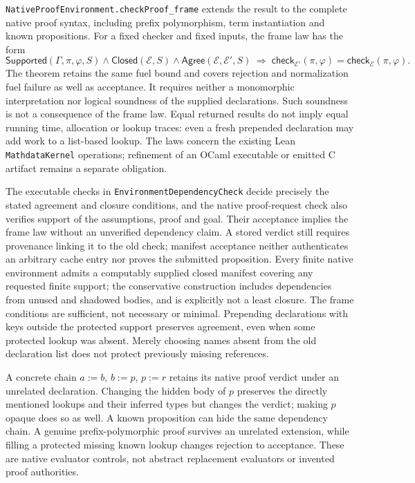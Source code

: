 \documentclass[11pt]{article}
\theoremstyle{definition}
\theoremstyle{remark}
\begin{document}
\begin{enumerate}
  \nolinkurl{NativeProofEnvironment.checkProof_frame} extends the result to
  the complete native proof syntax, including prefix polymorphism, term
  instantiation and known propositions. For a fixed checker and fixed inputs,
  the frame law has the form
  \[
    \mathsf{Supported}(\Gamma,\pi,\varphi,S)
    \land\mathsf{Closed}(\mathcal E,S)
    \land\mathsf{Agree}(\mathcal E,\mathcal E',S)
    \;\Longrightarrow\;
    \mathsf{check}_{\mathcal E'}(\pi,\varphi)
      =\mathsf{check}_{\mathcal E}(\pi,\varphi).
  \]
  The theorem retains the same fuel bound and covers rejection and normalization
  fuel failure as well as acceptance. It requires neither a monomorphic
  interpretation nor logical soundness of the supplied declarations. Such
  soundness is not a consequence of the frame law. Equal returned results do
  not imply equal running time, allocation or lookup traces: even a fresh
  prepended declaration may add work to a list-based lookup. The laws concern
  the existing Lean \nolinkurl{MathdataKernel} operations; refinement of an
  OCaml executable or emitted C artifact remains a separate obligation.

  The executable checks in \nolinkurl{EnvironmentDependencyCheck} decide
  precisely the stated agreement and closure conditions, and the native
  proof-request check also verifies support of the assumptions, proof and
  goal. Their acceptance implies the frame law without an unverified
  dependency claim. A stored verdict still requires provenance linking it to
  the old check; manifest acceptance neither authenticates an arbitrary cache
  entry nor proves the submitted proposition. Every finite native environment admits a computably
  supplied closed manifest covering any requested finite support; the
  conservative construction includes dependencies from unused and shadowed
  bodies, and is explicitly not a least closure. The frame conditions are
  sufficient, not necessary or minimal.
  Prepending declarations with keys outside the protected support preserves
  agreement, even when some protected lookup was absent. Merely choosing names
  absent from the old declaration list does not protect previously missing
  references.

  A concrete chain $a:=b$, $b:=p$, $p:=r$ retains its native proof verdict under
  an unrelated declaration. Changing the hidden body of $p$ preserves the
  directly mentioned lookups and their inferred types but changes the verdict;
  making $p$ opaque does so as well. A known proposition can hide the same
  dependency chain. A genuine prefix-polymorphic proof survives an unrelated
  extension, while filling a protected missing known lookup changes rejection
  to acceptance. These are native evaluator controls, not abstract replacement
  evaluators or invented proof authorities.


\end{enumerate}
\end{document}
